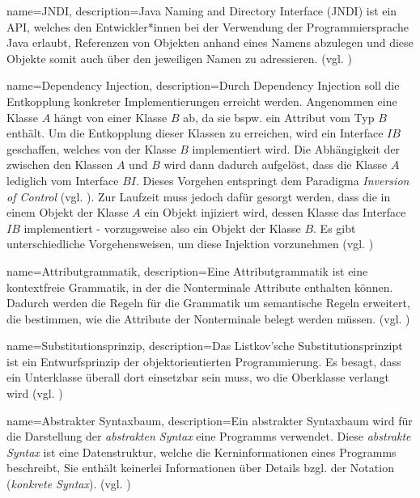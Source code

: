 {
    name=JNDI,
    description={Java Naming and Directory Interface (JNDI) ist ein API, welches den Entwickler*innen bei der Verwendung der Programmiersprache Java erlaubt, Referenzen von Objekten anhand eines Namens abzulegen und diese Objekte somit auch über den jeweiligen Namen zu adressieren. (vgl. \cite{jndi})}
}

{
    name=Dependency Injection,
    description={Durch Dependency Injection soll die Entkopplung konkreter Implementierungen erreicht werden. Angenommen eine Klasse $A$ hängt von einer Klasse $B$ ab, da sie bspw. ein Attribut vom Typ $B$ enthält. Um die Entkopplung dieser Klassen zu erreichen, wird ein \Gls{Interface} $\mathit{IB}$ geschaffen, welches von der Klasse $B$ implementiert wird. Die Abhängigkeit der zwischen den Klassen $A$ und $B$ wird dann dadurch aufgelöst, dass die Klasse $A$ lediglich vom \Gls{Interface} $BI$. Dieses Vorgehen entspringt dem Paradigma \emph{Inversion of Control} (vgl. \cite{patterns}). Zur Laufzeit muss jedoch dafür gesorgt werden, dass die in einem Objekt der Klasse $A$ ein Objekt injiziert wird, dessen Klasse das Interface $\mathit{IB}$ implementiert - vorzugsweise also ein Objekt der Klasse $B$. Es gibt unterschiedliche Vorgehensweisen, um diese Injektion vorzunehmen (vgl. \cite{setterinjection})}
}

{
    name=Attributgrammatik,
    description={Eine Attributgrammatik ist eine kontextfreie Grammatik, in der die Nonterminale Attribute enthalten können. Dadurch werden die Regeln für die Grammatik um semantische Regeln erweitert, die bestimmen, wie die Attribute der Nonterminale belegt werden müssen. (vgl. \cite{attrGr})}
}

{
    name=Substitutionsprinzip,
    description={Das Listkov'sche Substitutionsprinzipt ist ein Entwurfsprinzip der objektorientierten Programmierung. Es besagt, dass ein Unterklasse überall dort einsetzbar sein muss, wo die Oberklasse verlangt wird (vgl. \cite{patterns})}
}



{
    name=Abstrakter Syntaxbaum,
    description={Ein abstrakter Syntaxbaum wird für die Darstellung der \emph{abstrakten Syntax} eine Programms verwendet. Diese \emph{abstrakte Syntax} ist eine Datenstruktur, welche die Kerninformationen eines Programms beschreibt, Sie enthält keinerlei Informationen über Details bzgl. der Notation (\emph{konkrete Syntax}). (vgl. \cite{dsl})}
}

